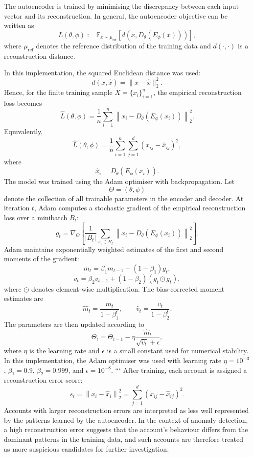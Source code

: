 The autoencoder is trained by minimising the discrepancy between each input
vector and its reconstruction. In general, the autoencoder objective can be
written as
\[
L(\theta,\phi)
:=
\mathbb{E}_{x\sim\mu_{\mathrm{ref}}}
\left[
d\left(x,D_{\theta}(E_{\phi}(x))\right)
\right],
\]
where \(\mu_{\mathrm{ref}}\) denotes the reference distribution of the training
data and \(d(\cdot,\cdot)\) is a reconstruction distance.

In this implementation, the squared Euclidean distance was used:
\[
d(x,\hat{x})
=
\|x-\hat{x}\|_2^2.
\]
Hence, for the finite training sample \(X=\{x_i\}_{i=1}^{n}\), the empirical
reconstruction loss becomes
\[
\widehat{L}(\theta,\phi)
=
\frac{1}{n}
\sum_{i=1}^{n}
\left\|
x_i-D_{\theta}(E_{\phi}(x_i))
\right\|_2^2.
\]
Equivalently,
\[
\widehat{L}(\theta,\phi)
=
\frac{1}{n}
\sum_{i=1}^{n}
\sum_{j=1}^{d}
\left(x_{ij}-\hat{x}_{ij}\right)^2,
\]
where
\[
\hat{x}_i=D_{\theta}(E_{\phi}(x_i)).
\]
The model was trained using the Adam optimiser with backpropagation. Let
\[
\Theta=(\theta,\phi)
\]
denote the collection of all trainable parameters in the encoder and decoder.
At iteration \(t\), Adam computes a stochastic gradient of the empirical
reconstruction loss over a minibatch \(B_t\):
\[
g_t
=
\nabla_{\Theta}
\left[
\frac{1}{|B_t|}
\sum_{x_i\in B_t}
\left\|
x_i-D_{\theta}(E_{\phi}(x_i))
\right\|_2^2
\right].
\]
Adam maintains exponentially weighted estimates of the first and second moments
of the gradient:
\[
m_t
=
\beta_1 m_{t-1} + (1-\beta_1)g_t,
\]
\[
v_t
=
\beta_2 v_{t-1} + (1-\beta_2)(g_t\odot g_t),
\]
where \(\odot\) denotes element-wise multiplication. The bias-corrected moment
estimates are
\[
\hat{m}_t
=
\frac{m_t}{1-\beta_1^t},
\qquad
\hat{v}_t
=
\frac{v_t}{1-\beta_2^t}.
\]
The parameters are then updated according to
\[
\Theta_t
=
\Theta_{t-1}
-
\eta
\frac{\hat{m}_t}{\sqrt{\hat{v}_t}+\epsilon},
\]
where \(\eta\) is the learning rate and \(\epsilon\) is a small constant used for
numerical stability. In this implementation, the Adam optimiser was used with
learning rate \(\eta=10^{-3}\), \(\beta_1=0.9\), \(\beta_2=0.999\), and
\(\epsilon=10^{-8}\).
```
After training, each account is assigned a reconstruction error score:
\[
s_i
=
\left\|x_i-\hat{x}_i\right\|_2^2
=
\sum_{j=1}^{d}
\left(x_{ij}-\hat{x}_{ij}\right)^2.
\]
Accounts with larger reconstruction errors are interpreted as less well
represented by the patterns learned by the autoencoder. In the context of
anomaly detection, a high reconstruction error suggests that the account's
behaviour differs from the dominant patterns in the training data, and such
accounts are therefore treated as more suspicious candidates for further
investigation.


